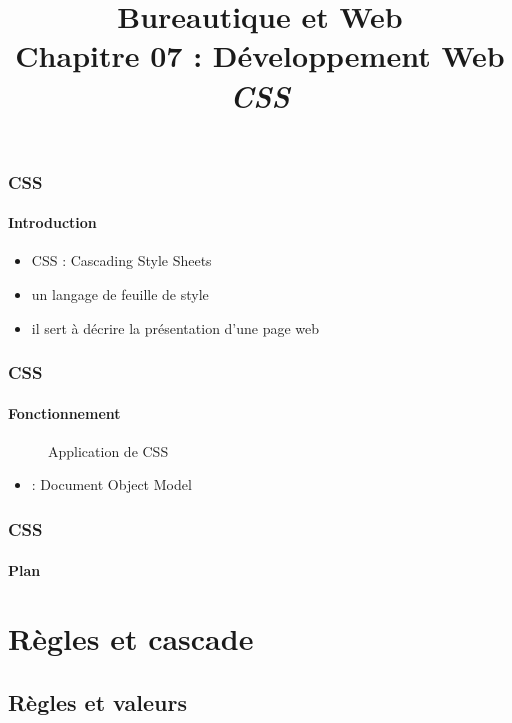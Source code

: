 \documentclass[xcolor=table]{beamer}
\title[BWEB : 07- CSS] %
{Bureautique et Web \\Chapitre 07 : Développement Web\\ \slshape\small  CSS}
\begin{document}
	
\begin{frame}
\frametitle{CSS}
\framesubtitle{Introduction}

\begin{itemize}
	\item CSS : Cascading Style Sheets
	\item un langage de feuille de style 
	\item il sert à décrire la présentation d'une page web
\end{itemize}

\end{frame}

\begin{frame}
\frametitle{CSS}
\framesubtitle{Fonctionnement}

\begin{figure}
	\centering
	\caption{Application de CSS \cite{mdn}}
\end{figure}
\begin{itemize}
	\item {} : Document Object Model
\end{itemize}

\end{frame}


\begin{frame}
\frametitle{CSS}
\framesubtitle{Plan}

\begin{multicols}{2}
\tableofcontents
\end{multicols}
\end{frame}

\section{Règles et cascade}

\subsection{Règles et valeurs}
\end{document}

